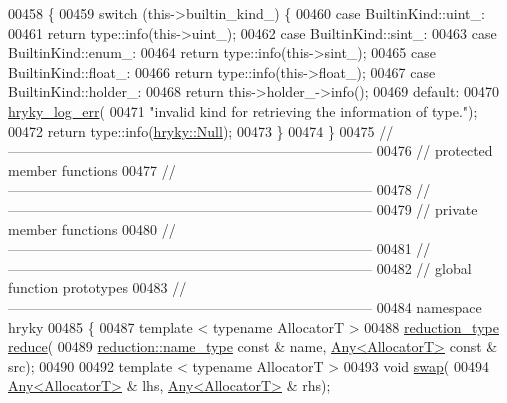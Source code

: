 \begin{DoxyCode}
00458 \textcolor{keyword}{}\{
00459     \textcolor{keywordflow}{switch} (this->builtin\_kind\_) \{
00460     \textcolor{keywordflow}{case} BuiltinKind::uint\_:
00461         \textcolor{keywordflow}{return} type::info(this->uint\_);
00462     \textcolor{keywordflow}{case} BuiltinKind::sint\_:
00463     \textcolor{keywordflow}{case} BuiltinKind::enum\_:
00464         \textcolor{keywordflow}{return} type::info(this->sint\_);
00465     \textcolor{keywordflow}{case} BuiltinKind::float\_:
00466         \textcolor{keywordflow}{return} type::info(this->float\_);
00467     \textcolor{keywordflow}{case} BuiltinKind::holder\_:
00468         \textcolor{keywordflow}{return} this->holder\_->info();
00469     \textcolor{keywordflow}{default}:
00470         \hyperlink{log__writer__common_8h_ae5ad3dabb33f594695ef40753cb78aad}{hryky_log_err}(
00471             \textcolor{stringliteral}{"invalid kind for retrieving the information of type."});
00472         \textcolor{keywordflow}{return} type::info(\hyperlink{classhryky_1_1_null}{hryky::Null});
00473     \}
00474 \}
00475 \textcolor{comment}{//
      ------------------------------------------------------------------------------}
00476 \textcolor{comment}{// protected member functions}
00477 \textcolor{comment}{//
      ------------------------------------------------------------------------------}
00478 \textcolor{comment}{//
      ------------------------------------------------------------------------------}
00479 \textcolor{comment}{// private member functions}
00480 \textcolor{comment}{//
      ------------------------------------------------------------------------------}
00481 \textcolor{comment}{//
      ------------------------------------------------------------------------------}
00482 \textcolor{comment}{// global function prototypes}
00483 \textcolor{comment}{//
      ------------------------------------------------------------------------------}
00484 \textcolor{keyword}{namespace }hryky
00485 \{
00487     \textcolor{keyword}{template} < \textcolor{keyword}{typename} AllocatorT >
00488     \hyperlink{classhryky_1_1_intrusive_ptr}{reduction_type} \hyperlink{namespacehryky_af41cb3af6766761da0ff21b84527a52c}{reduce}(
00489         \hyperlink{classhryky_1_1reduction_1_1_string}{reduction::name_type} \textcolor{keyword}{const} & name, \hyperlink{classhryky_1_1_any}{Any<AllocatorT>} \textcolor{keyword}{const} & src);
00490 
00492     \textcolor{keyword}{template} < \textcolor{keyword}{typename} AllocatorT >
00493     \textcolor{keywordtype}{void} \hyperlink{namespacehryky_a4282146df5ea2b68cb667896a2205909}{swap}(
00494         \hyperlink{classhryky_1_1_any}{Any<AllocatorT>} & lhs, \hyperlink{classhryky_1_1_any}{Any<AllocatorT>} & rhs);

\end{DoxyCode}
